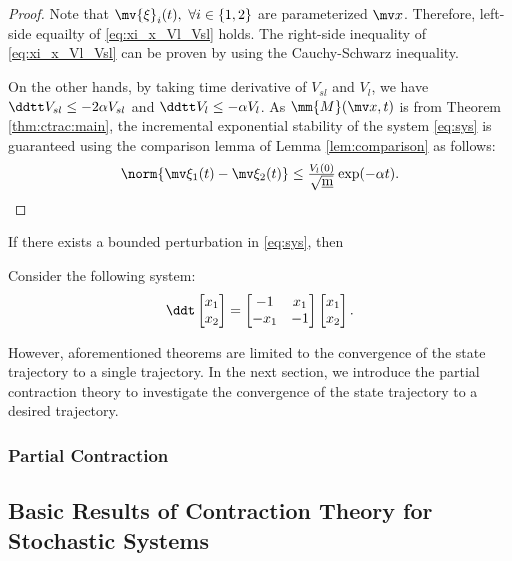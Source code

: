 \begin{proof}
    Note that $\mv{\xi}_i(t),\ \forall i\in\{1,2\}$ are parameterized $\bdx$.
    Therefore, left-side equailty of \eqref{eq:xi_x_Vl_Vsl} holds.
    The right-side inequality of \eqref{eq:xi_x_Vl_Vsl} can be proven by using the Cauchy-Schwarz inequality.

    On the other hands, by taking time derivative of $V_{sl}$ and $V_l$, we have $\ddtt V_{sl} \le -2\alpha V_{sl}$ and $\ddtt V_l \le -\alpha V_l$.
    As $\mm{M}(\bdx,t)$ is from Theorem \ref{thm:ctrac:main}, the incremental exponential stability of the system \eqref{eq:sys} is guaranteed using the comparison lemma of Lemma \ref{lem:comparison} as follows: 
    \begin{equation}
        \norm{\mv\xi_1(t)-\mv\xi_2(t)}
        \le
        \tfrac{V_{l}(0)}{\sqrt{\underbar{m}}} \exp(-\alpha t)
        .
    \end{equation}
\end{proof}

If there exists a bounded perturbation in \eqref{eq:sys}, then 

\hfill

\begin{example}
    Consider the following system:
    \begin{equation}
        \ddt
        \begin{bmatrix}
            x_1\\
            x_2
        \end{bmatrix}
        =
        \begin{bmatrix}
            -1 & x_1\\
            -x_1 & -1
        \end{bmatrix}
        \begin{bmatrix}
            x_1\\
            x_2
        \end{bmatrix}
        .
    \end{equation}
\end{example}

\hfill

However, aforementioned theorems are limited to the convergence of the state trajectory to a single trajectory.
In the next section, we introduce the partial contraction theory to investigate the convergence of the state trajectory to a desired trajectory.

\subsubsection{Partial Contraction}

\cite{Wang:2004aa,Jouffroy:2004aa}

\subsection{Basic Results of Contraction Theory for Stochastic Systems}
